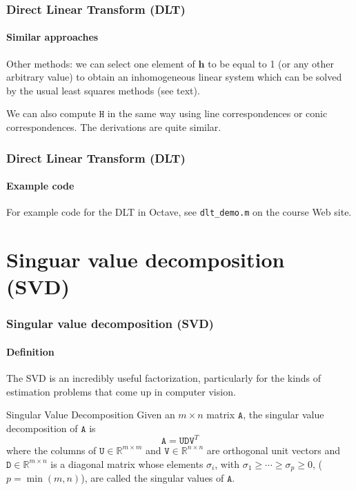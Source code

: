 \documentclass[aspectratio=169]{beamer}
\renewcommand{\vec}[1]{\boldsymbol{#1}}
\newcommand{\mat}[1]{\mathtt{#1}}
\def\Rset{\mathbb{R}}
\begin{document}
\begin{frame}
\frametitle{Direct Linear Transform (DLT)}
\framesubtitle{Similar approaches}

Other methods: we can select one element of $\vec{h}$ to be equal to 1
(or any other arbitrary value) to obtain an inhomogeneous linear
system which can be solved by the usual least squares methods (see
text).

\medskip

We can also compute $\mat{H}$ in the same way using line
correspondences or conic correspondences.  The derivations are quite
similar.

\end{frame}

\begin{frame}
\frametitle{Direct Linear Transform (DLT)}
\framesubtitle{Example code}

For example code for the DLT in Octave, see \texttt{dlt\_demo.m} on
the course Web site.

\end{frame}

\section{Singuar value decomposition (SVD)}

\begin{frame}
\frametitle{Singular value decomposition (SVD)}
\framesubtitle{Definition}

The SVD is an incredibly useful factorization, particularly for the
kinds of estimation problems that come up in computer vision.

\medskip

\begin{block}{Singular Value Decomposition}
Given an $m\times n$ matrix $\mat{A}$, the \alert{singular value
  decomposition} of $\mat{A}$ is
\begin{equation*}
\mat{A} = \mat{U}\mat{D}\mat{V}^T
\end{equation*}
where the columns of $\mat{U} \in \Rset^{m\times m}$ and $\mat{V} \in
\Rset^{n\times n}$ are orthogonal unit vectors and $\mat{D} \in
\Rset^{m\times n}$ is a diagonal matrix whose elements $\sigma_i$,
with $\sigma_1 \ge \cdots \ge \sigma_p \ge 0$, ($p=\min(m,n)$), are
called the \alert{singular values} of $\mat{A}$.
\end{block}

\end{frame}
\end{document}
